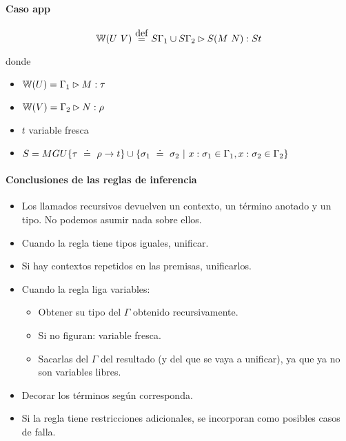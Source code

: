\paragraph{Caso app}

\[\w{\app{U}{V}} \eqdef S\Gamma_1 \cup S\Gamma_2 \rhd S(\app{M}{N}) : St \]

donde
\begin{itemize}
  \item $\mathbb{W}(U) = \Gamma_1 \rhd M : \tau$
  \item $\mathbb{W}(V) = \Gamma_2 \rhd N : \rho$
  \item $t$ variable fresca
  \item $S = MGU\{\tau \uni \rho\to t\} \cup \{\sigma_1 \uni \sigma_2 \vert x:\sigma_1 \in \Gamma_1, x:\sigma_2 \in \Gamma_2\}$
\end{itemize}

\paragraph{Conclusiones de las reglas de inferencia}

\begin{itemize}
  \item Los llamados recursivos devuelven un contexto, un término anotado y un tipo. No podemos asumir nada sobre ellos.
  \item Cuando la regla tiene tipos iguales, unificar.
  \item Si hay contextos repetidos en las premisas, unificarlos.
  \item Cuando la regla liga variables:
  \begin{itemize}
    \item Obtener su tipo del $\Gamma$ obtenido recursivamente.
    \item Si no figuran: variable fresca.
    \item Sacarlas del $\Gamma$ del resultado (y del que se vaya a unificar), ya que ya no son variables libres.
  \end{itemize}
  \item Decorar los términos según corresponda.
  \item Si la regla tiene restricciones adicionales, se incorporan como posibles casos de falla.
\end{itemize}
